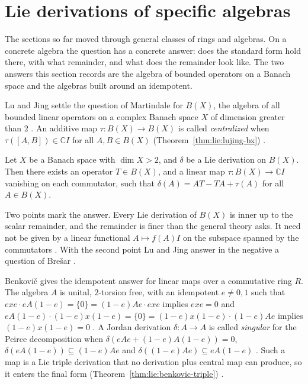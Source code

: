 \section{Lie derivations of specific algebras}\label{sec:lie-type:lie-on-algebras}

The sections so far moved through general classes of rings and algebras. On a
concrete algebra the question has a concrete answer: does the standard form
hold there, with what remainder, and what does the remainder look like. The two
answers this section records are the algebra of bounded operators on a Banach
space and the algebras built around an idempotent.

Lu and Jing settle the question of Martindale for $B(X)$, the algebra of all
bounded linear operators on a complex Banach space $X$ of dimension greater
than $2$ \cite[p.~91]{LuJing2010}. An additive map $\tau\colon B(X)\to B(X)$
is called \emph{centralized} when $\tau([A,B])\in\mathbb{C}I$ for all
$A,B\in B(X)$ (Theorem~\ref{thm:lie:lujing-bx}) \cite[p.~91]{LuJing2010}.

\begin{theorem}\label{thm:lie:lujing-bx}
Let $X$ be a Banach space with $\dim X>2$, and $\delta$ be a Lie derivation on
$B(X)$. Then there exists an operator $T\in B(X)$, and a linear map
$\tau\colon B(X)\to\mathbb{C}I$ vanishing on each commutator, such that
$\delta(A)=AT-TA+\tau(A)$ for all $A\in B(X)$.
\end{theorem}

Two points mark the answer.
Every Lie derivation of $B(X)$ is inner up to the
scalar remainder, and the remainder is finer than the general theory asks.
It need not be given by a linear functional $A\mapsto f(A)I$ on the subspace
spanned by the commutators \cite[p.~91]{LuJing2010}.
With the second point Lu and Jing answer in the negative a question of Brešar
\cite[p.~92]{LuJing2010}.

Benkovič gives the idempotent answer for linear maps over a commutative ring
$R$. The algebra $A$ is unital, $2$-torsion free, with an idempotent $e\ne0,1$
such that $exe\cdot eA(1-e)=\{0\}=(1-e)Ae\cdot exe$ implies $exe=0$ and
$eA(1-e)\cdot(1-e)x(1-e)=\{0\}=(1-e)x(1-e)\cdot(1-e)Ae$ implies
$(1-e)x(1-e)=0$ \cite[p.~141]{Benkovic2015}. A Jordan derivation
$\delta\colon A\to A$ is called \emph{singular} for the Peirce decomposition
when $\delta(eAe+(1-e)A(1-e))=0$, $\delta(eA(1-e))\subseteq(1-e)Ae$ and
$\delta((1-e)Ae)\subseteq eA(1-e)$ \cite[p.~144]{Benkovic2015}. Such a map is
a Lie triple derivation that no derivation plus central map can produce, so it
enters the final form (Theorem~\ref{thm:lie:benkovic-triple}) \cite[p.~144]{Benkovic2015}.

